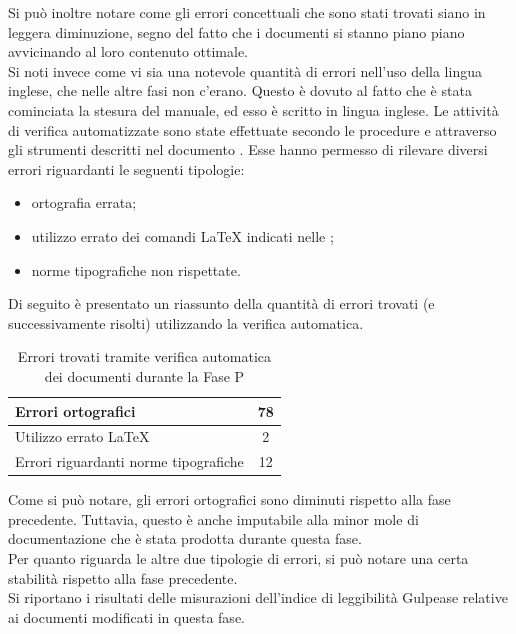 				Si può inoltre notare come gli errori concettuali che sono stati trovati siano in leggera diminuzione, segno del fatto che i documenti si stanno piano piano avvicinando al loro contenuto ottimale.\\
				Si noti invece come vi sia una notevole quantità di errori nell'uso della lingua inglese, che nelle altre fasi non c'erano. Questo è dovuto al fatto che è stata cominciata la stesura del manuale, ed esso è scritto in lingua inglese.
				Le attività di verifica automatizzate sono state effettuate secondo le procedure e attraverso gli strumenti descritti nel documento . Esse hanno permesso di rilevare diversi errori riguardanti le seguenti tipologie:
				\begin{itemize}
					\item ortografia errata;
					\item utilizzo errato dei comandi \LaTeX{} indicati nelle ;
					\item norme tipografiche non rispettate.
				\end{itemize}
				Di seguito è presentato un riassunto della quantità di errori trovati (e successivamente risolti) utilizzando la verifica automatica.
				\begin{table}[H]
					\centering
						\begin{tabu}{| l | c |}
							\hline
							Errori ortografici	& 78	\\ \hline
							Utilizzo errato \LaTeX{}	& 2	\\ \hline
							Errori riguardanti norme tipografiche	& 12	\\ \hline
						\end{tabu}
					\caption{Errori trovati tramite verifica automatica dei documenti durante la Fase P}
				\end{table}
				Come si può notare, gli errori ortografici sono diminuti rispetto alla fase precedente. Tuttavia, questo è anche imputabile alla minor mole di documentazione che è stata prodotta durante questa fase.\\
				Per quanto riguarda le altre due tipologie di errori, si può notare una certa stabilità rispetto alla fase precedente.\\
				Si riportano i risultati delle misurazioni dell'indice di leggibilità Gulpease relative ai documenti modificati in questa fase.
